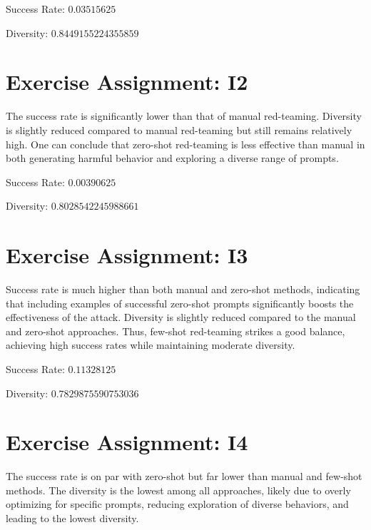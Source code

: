 \documentclass{article}
\begin{document}
\begin{arrowlist}
    \item Success Rate: $0.03515625$
    \item Diversity: $0.8449155224355859$
\end{arrowlist}

\section{Exercise Assignment: I2}
The success rate is significantly lower than that of manual red-teaming.
Diversity is slightly reduced compared to manual red-teaming but still remains relatively high. One can conclude that zero-shot red-teaming is less effective than manual in both generating harmful behavior and exploring a diverse range of prompts.

\begin{arrowlist}
    \item Success Rate: $0.00390625$
    \item Diversity: $0.8028542245988661$
\end{arrowlist}


\section{Exercise Assignment: I3}
Success rate is much higher than both manual and zero-shot methods, indicating that including examples of successful zero-shot prompts significantly boosts the effectiveness of the attack. Diversity is slightly reduced compared to the manual and zero-shot approaches. Thus, few-shot red-teaming strikes a good balance, achieving high success rates while maintaining moderate diversity.

\begin{arrowlist}
    \item Success Rate: $0.11328125$
    \item Diversity: $0.7829875590753036$
\end{arrowlist}

\section{Exercise Assignment: I4}
The success rate is on par with zero-shot but far lower than manual and few-shot methods. The diversity is the lowest among all approaches, likely due to overly optimizing for specific prompts, reducing exploration of diverse behaviors, and leading to the lowest diversity.
\end{document}
